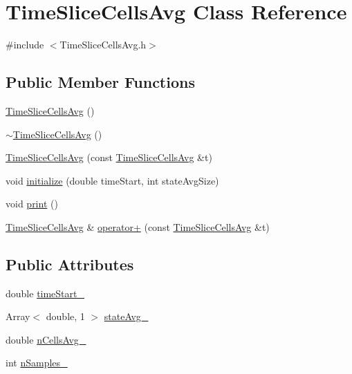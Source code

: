 \hypertarget{class_time_slice_cells_avg}{\section{\-Time\-Slice\-Cells\-Avg \-Class \-Reference}
\label{class_time_slice_cells_avg}
}


{\ttfamily \#include $<$\-Time\-Slice\-Cells\-Avg.\-h$>$}

\subsection*{\-Public \-Member \-Functions}
\begin{DoxyCompactItemize}
\item 
\hyperlink{class_time_slice_cells_avg_abbea3bc8f90af9c7a21bfe161b8b3782}{\-Time\-Slice\-Cells\-Avg} ()
\item 
\hyperlink{class_time_slice_cells_avg_a61c34d56ddf14617a7a3f1d59a7c123e}{$\sim$\-Time\-Slice\-Cells\-Avg} ()
\item 
\hyperlink{class_time_slice_cells_avg_a937eaad3d04d45b237f3c0348d273e57}{\-Time\-Slice\-Cells\-Avg} (const \hyperlink{class_time_slice_cells_avg}{\-Time\-Slice\-Cells\-Avg} \&t)
\item 
void \hyperlink{class_time_slice_cells_avg_a700051de976002f1388c378ad7ee71ca}{initialize} (double time\-Start, int state\-Avg\-Size)
\item 
void \hyperlink{class_time_slice_cells_avg_a90169cc38aafdaf0269a10f926289783}{print} ()
\item 
\hyperlink{class_time_slice_cells_avg}{\-Time\-Slice\-Cells\-Avg} \& \hyperlink{class_time_slice_cells_avg_ab0779f20c3146a7e3377767b38260e37}{operator+} (const \hyperlink{class_time_slice_cells_avg}{\-Time\-Slice\-Cells\-Avg} \&t)
\end{DoxyCompactItemize}
\subsection*{\-Public \-Attributes}
\begin{DoxyCompactItemize}
\item 
double \hyperlink{class_time_slice_cells_avg_a26cd7ddaee9fd247af1b03c019efdc27}{time\-Start\-\_\-}
\item 
\-Array$<$ double, 1 $>$ \hyperlink{class_time_slice_cells_avg_aac43db30ea3a41ee3ed291a557a73a25}{state\-Avg\-\_\-}
\item 
double \hyperlink{class_time_slice_cells_avg_ac609f33983b3baf1de2a8191f668babf}{n\-Cells\-Avg\-\_\-}
\item 
int \hyperlink{class_time_slice_cells_avg_a9fff6ffad7cd3089cd7a1b4b9cd63a71}{n\-Samples\-\_\-}
\end{DoxyCompactItemize}


